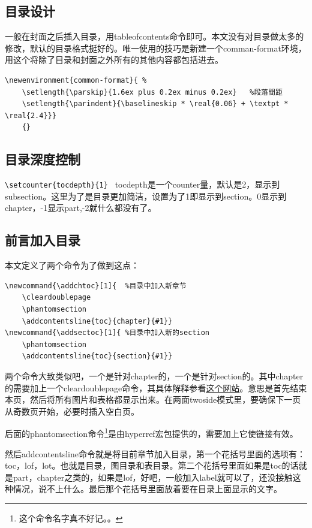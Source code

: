 \documentclass[11pt,oneside]{book}
\newlength{\textpt}
\begin{document}
\begin{common-format}
\section{目录设计}
一般在封面之后插入目录，用tableofcontents命令即可。本文没有对目录做太多的修改，默认的目录格式挺好的。唯一使用的技巧是新建一个comman-format环境，用这个将除了目录和封面之外所有的其他内容都包括进去。
\begin{Verbatim}
\newenvironment{common-format}{ %
	\setlength{\parskip}{1.6ex plus 0.2ex minus 0.2ex}   %段落間距
	\setlength{\parindent}{\baselineskip * \real{0.06} + \textpt * \real{2.4}}}  
    {}
\end{Verbatim}

\subsection{目录深度控制}
\verb+\setcounter{tocdepth}{1} +
tocdepth是一个counter量，默认是2，显示到subsection。这里为了是目录更加简洁，设置为了1即显示到section。0显示到chapter，-1显示part,-2就什么都没有了。

\subsection{前言加入目录}
\label{sec:前言加入目录}
本文定义了两个命令为了做到这点：
\begin{Verbatim}
\newcommand{\addchtoc}[1]{  %目录中加入新章节
	\cleardoublepage   
	\phantomsection    
	\addcontentsline{toc}{chapter}{#1}}
\newcommand{\addsectoc}[1]{ %目录中加入新的section
	\phantomsection    
	\addcontentsline{toc}{section}{#1}}	
\end{Verbatim}
两个命令大致类似吧，一个是针对chapter的，一个是针对section的。其中chapter的需要加上一个cleardoublepage命令，其具体解释参看\href{http://www.personal.ceu.hu/tex/breaking.htm#clrdblpage}{这个网站}。意思是首先结束本页，然后将所有图片和表格都显示出来。在两面twoside模式里，要确保下一页从奇数页开始，必要时插入空白页。

后面的phantomsection命令\footnote{这个命令名字真不好记。。}是由hyperref宏包提供的，需要加上它使链接有效。     

然后addcontentsline命令就是将目前章节加入目录，第一个花括号里面的选项有：toc，lof，lot。也就是目录，图目录和表目录。第二个花括号里面如果是toc的话就是part，chapter之类的，如果是lof，好吧，一般加入label就可以了，还没接触这种情况，说不上什么。最后那个花括号里面放着要在目录上面显示的文字。


\end{common-format}
\end{document}
